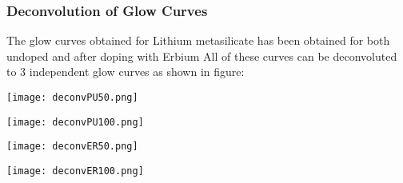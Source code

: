 \documentclass[../result.tex]{subfiles}
\begin{document}
    \subsubsection{Deconvolution of Glow Curves}

        The glow curves obtained for Lithium metasilicate has been obtained for both undoped and after doping with Erbium
        All of these curves can be deconvoluted to 3 independent glow curves as shown in figure:

        \FloatBarrier\begin{multicols}{2}
            \begin{Figure}
                \centering
                \texttt{[image: deconvPU50.png]}
                \label{fig:deconvPU50}
            \end{Figure}
            \begin{Figure}
                \centering
                \texttt{[image: deconvPU100.png]}
                \label{fig:deconvPU100}
            \end{Figure}
        \end{multicols}

        \FloatBarrier\begin{multicols}{2}
            \begin{Figure}
                \centering
                \texttt{[image: deconvER50.png]}
                \label{fig:deconvER50}
            \end{Figure}
            \begin{Figure}
                \centering
                \texttt{[image: deconvER100.png]}
                \label{fig:deconvER100}
            \end{Figure}
        \end{multicols}
\end{document}
